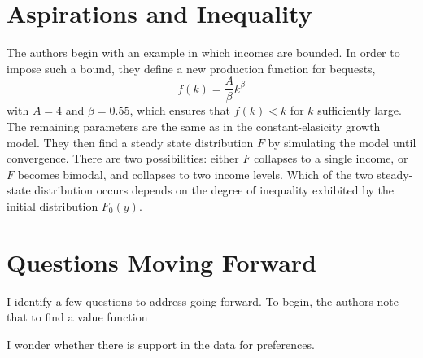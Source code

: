 \documentclass[11pt]{article}
\begin{document}
    \section{Aspirations and Inequality}
    The authors begin with an example in which incomes are bounded. In order to impose such a bound, they define a new production function for bequests,
    \[f(k) = \frac{A}{\beta}k^\beta\]
    with \( A = 4 \) and \( \beta = 0.55 \), which ensures that \( f(k) < k \) for \( k \) sufficiently large. The remaining parameters are the same as in the constant-elasicity growth model. They then find a steady state distribution \( F \) by simulating the model until convergence. There are two possibilities: either \( F \) collapses to a single income, or \( F \) becomes bimodal, and collapses to two income levels. Which of the two steady-state distribution occurs depends on the degree of inequality exhibited by the initial distribution \( F_0(y) \). 
    \section{Questions Moving Forward}
    I identify a few questions to address going forward. To begin, the authors note that to find a value function
    
    I wonder whether there is support in the data for preferences. 
\end{document}
